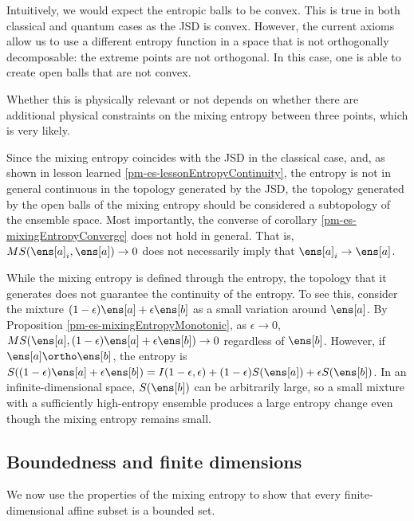 \begin{mathSection}
\begin{remark}
	Intuitively, we would expect the entropic balls to be convex. This is true in both classical and quantum cases as the JSD is convex. However, the current axioms allow us to use a different entropy function in a space that is not orthogonally decomposable: the extreme points are not orthogonal. In this case, one is able to create open balls that are not convex.
	
	Whether this is physically relevant or not depends on whether there are additional physical constraints on the mixing entropy between three points, which is very likely.
\end{remark}

\begin{remark}
	Since the mixing entropy coincides with the JSD in the classical case, and, as shown in lesson learned \ref{pm-es-lessonEntropyContinuity}, the entropy is not in general continuous in the topology generated by the JSD, the topology generated by the open balls of the mixing entropy should be considered a subtopology of the ensemble space. Most importantly, the converse of corollary \ref{pm-es-mixingEntropyConverge} does not hold in general. That is, $MS(\ens[a]_i, \ens[a]) \to 0$ does not necessarily imply that $\ens[a]_i \to \ens[a]$. 
\end{remark}
\end{mathSection}

While the mixing entropy is defined through the entropy, the topology that it generates does not guarantee the continuity of the entropy. To see this, consider the mixture $(1-\epsilon)\ens[a] + \epsilon \ens[b]$ as a small variation around $\ens[a]$. By Proposition \ref{pm-es-mixingEntropyMonotonic}, as $\epsilon \to 0$, $MS(\ens[a], (1-\epsilon)\ens[a] + \epsilon\ens[b]) \to 0$ regardless of $\ens[b]$. However, if $\ens[a] \ortho \ens[b]$, the entropy is $S((1-\epsilon)\ens[a] + \epsilon\ens[b]) = I(1-\epsilon, \epsilon) + (1-\epsilon)S(\ens[a]) + \epsilon S(\ens[b])$. In an infinite-dimensional space, $S(\ens[b])$ can be arbitrarily large, so a small mixture with a sufficiently high-entropy ensemble produces a large entropy change even though the mixing entropy remains small.

\subsection{Boundedness and finite dimensions}

We now use the properties of the mixing entropy to show that every finite-dimensional affine subset is a bounded set.

